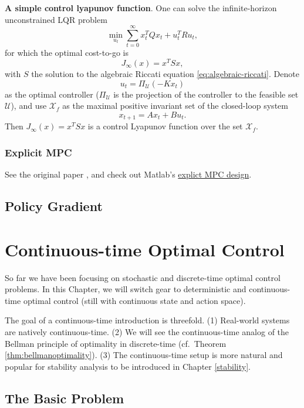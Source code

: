 \documentclass[
]{book}
\theoremstyle{definition}
\theoremstyle{definition}
\theoremstyle{definition}
\theoremstyle{definition}
\theoremstyle{remark}
\begin{document}
\textbf{A simple control lyapunov function}. One can solve the infinite-horizon unconstrained LQR problem
\[
\min_{u_t} \sum_{t=0}^{\infty}x_t ^T Q x_t + u_t^T R u_t,
\]
for which the optimal cost-to-go is
\[
J_{\infty}(x) = x^T S x, 
\]
with \(S\) the solution to the algebraic Riccati equation \eqref{eq:algebraic-riccati}. Denote
\[
u_t = \Pi_{\mathcal{U}} (- K x_t)
\]
as the optimal controller (\(\Pi_{\mathcal{U}}\) is the projection of the controller to the feasible set \(\mathcal{U}\)), and use \(\mathcal{X}_f\) as the maximal positive invariant set of the closed-loop system
\[
x_{t+1} = A x_t + B u_t.
\]
Then \(J_{\infty}(x) = x^T S x\) is a control Lyapunov function over the set \(\mathcal{X}_f\).

\hypertarget{explicit-mpc}{%
\subsection{Explicit MPC}\label{explicit-mpc}}

See the original paper \citep{bemporad02automatica-explicit}, and check out Matlab's \href{https://www.mathworks.com/help/mpc/explicit-mpc-design.html}{explict MPC design}.

\hypertarget{policy-gradient}{%
\section{Policy Gradient}\label{policy-gradient}}

\hypertarget{continuous-time-optimal-control}{%
\chapter{Continuous-time Optimal Control}\label{continuous-time-optimal-control}}

So far we have been focusing on stochastic and discrete-time optimal control problems. In this Chapter, we will switch gear to deterministic and continuous-time optimal control (still with continuous state and action space).

The goal of a continuous-time introduction is threefold. (1) Real-world systems are natively continuous-time. (2) We will see the continuous-time analog of the Bellman principle of optimality in discrete-time (cf.~Theorem \ref{thm:bellmanoptimality}). (3) The continuous-time setup is more natural and popular for stability analysis to be introduced in Chapter \ref{stability}.

\hypertarget{the-basic-problem-1}{%
\section{The Basic Problem}\label{the-basic-problem-1}}
\end{document}
